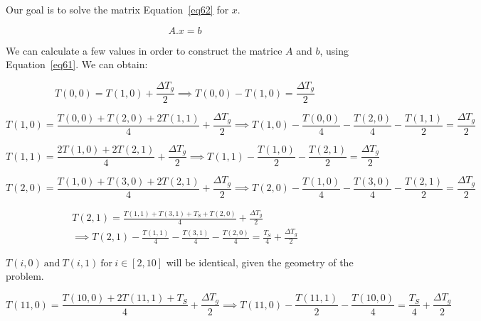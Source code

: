 Our goal is to solve the matrix Equation~\ref{eq62} for $x$.

\begin{equation}\label{eq62}
A . x = b
\end{equation}

We can calculate a few values in order to construct the matrice $A$ and $b$, using Equation~\ref{eq61}. We can obtain:

\begin{equation}\label{eq63}
T(0,0) = T(1,0) + \frac{\Delta T_g}{2} \implies T(0,0) - T(1,0) = \frac{\Delta T_g}{2}
\end{equation}

\begin{equation}\label{eq64}
T(1,0) = \frac{T(0,0) + T(2,0) + 2T(1,1)}{4} + \frac{\Delta T_g}{2} \implies T(1,0) - \frac{T(0,0)}{4} - \frac{T(2,0)}{4} - \frac{T(1,1)}{2} = \frac{\Delta T_g}{2}
\end{equation}

\begin{equation}\label{eq65}
T(1,1) = \frac{2T(1,0) + 2T(2,1)}{4} + \frac{\Delta T_g}{2} \implies T(1,1) - \frac{T(1,0)}{2} - \frac{T(2,1)}{2} = \frac{\Delta T_g}{2}
\end{equation}

\begin{equation}\label{eq66}
T(2,0) = \frac{T(1,0) + T(3,0) + 2T(2, 1)}{4} + \frac{\Delta T_g}{2} \implies T(2,0) - \frac{T(1,0)}{4} - \frac{T(3,0)}{4} - \frac{T(2,1)}{2} = \frac{\Delta T_g}{2}
\end{equation}

\begin{equation}\label{eq67}
\begin{aligned}
T(2,1) = \frac{T(1,1) + T(3,1) + T_S + T(2,0)}{4} + \frac{\Delta T_g}{2} \\ \implies T(2,1) - \frac{T(1,1)}{4} - \frac{T(3,1)}{4} - \frac{T(2,0)}{4} = \frac{T_S}{4} + \frac{\Delta T_g}{2}
\end{aligned}
\end{equation}

$T(i,0)\ \text{and}\ T(i,1)\ \text{for}\ i \in [2,10]$ will be identical, given the geometry of the problem.

\begin{equation}\label{eq68}
T(11,0) = \frac{T(10,0) + 2T(11,1) + T_S}{4} + \frac{\Delta T_g}{2} \implies T(11,0) - \frac{T(11,1)}{2} - \frac{T(10,0)}{4} = \frac{T_S}{4} + \frac{\Delta T_g}{2}
\end{equation}

